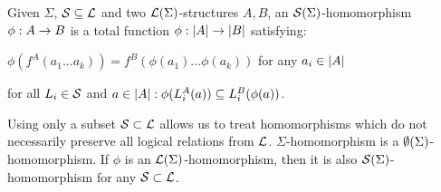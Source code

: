 \documentclass[12pt]{article}
\begin{document}
\begin{Definition}
Given $\Sigma$, ${\cal{S}}\subseteq {{\cal{L}}}$ and two ${{\cal{L}}}(\Sigma)$-structures $A,B$, an
${{\cal{S}}}(\Sigma)$-homomorphism $\phi:A\rightarrow B$ is a total function
$\phi:|A|\rightarrow|B|$ satisfying:
\begin{enum}
\item $\phi(f^A(a_1...a_k)) = f^B(\phi(a_1)...\phi(a_k))$ for any
$a_i\in|A|$
\item for all $L_i\in {\cal{S}}$ and $a\in|A|: \phi(L_i^A(a)) \subseteq
L_i^B(\phi(a))$.
\end{enum}
\end{Definition}
Using only a subset ${\cal{S}}\subset {{\cal{L}}}$ allows us to treat homomorphisms which do
not necessarily preserve all logical relations from
${{\cal{L}}}$. $\Sigma$-homomorphism is a ${{\cal{\emptyset}}}(\Sigma)$-homomorphism. If
$\phi$ is an ${{\cal{L}}}(\Sigma)$-homomorphism, then it is also ${{\cal{S}}}(\Sigma)$-homomorphism
for any ${\cal{S}}\subset {{\cal{L}}}$.
\end{document}
